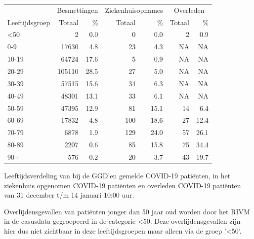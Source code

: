 \documentclass[
  english,
  man,floatsintext]{apa6}
\begin{document}
\begin{table}
\centering\begingroup\fontsize{11}{13}\selectfont

\begin{threeparttable}
\begin{tabular}{lrrrrrr}
\toprule
\multicolumn{1}{c}{ } & \multicolumn{2}{c}{Besmettingen} & \multicolumn{2}{c}{Ziekenhuisopnames} & \multicolumn{2}{c}{Overleden} \\
\cmidrule(l{3pt}r{3pt}){2-3} \cmidrule(l{3pt}r{3pt}){4-5} \cmidrule(l{3pt}r{3pt}){6-7}
Leeftijdsgroep & Totaal & \% & Totaal & \% & Totaal & \%\\
\midrule
<50 & 2 & 0.0 & 0 & 0.0 & 2 & 0.9\\
0-9 & 17630 & 4.8 & 23 & 4.3 & NA & NA\\
10-19 & 64724 & 17.6 & 5 & 0.9 & NA & NA\\
20-29 & 105110 & 28.5 & 27 & 5.0 & NA & NA\\
30-39 & 57515 & 15.6 & 34 & 6.3 & NA & NA\\
40-49 & 48301 & 13.1 & 33 & 6.1 & NA & NA\\
50-59 & 47395 & 12.9 & 81 & 15.1 & 14 & 6.4\\
60-69 & 17832 & 4.8 & 100 & 18.6 & 27 & 12.4\\
70-79 & 6878 & 1.9 & 129 & 24.0 & 57 & 26.1\\
80-89 & 2207 & 0.6 & 85 & 15.8 & 75 & 34.4\\
90+ & 576 & 0.2 & 20 & 3.7 & 43 & 19.7\\
\bottomrule
\end{tabular}
\begin{tablenotes}
\item[1] Leeftijdsverdeling van bij de GGD’en gemelde COVID-19 patiënten, in het ziekenhuis opgenomen COVID-19 patiënten en overleden COVID-19 patiënten van 31 december t/m 14 januari 10:00 uur.
\item[2] Overlijdensgevallen van patiënten jonger dan 50 jaar oud worden door het RIVM in de casusdata gegroepeerd in de categorie <50. Deze overlijdensgevallen zijn hier dus niet zichtbaar in deze leeftijdsgroepen maar alleen via de groep '<50'.
\end{tablenotes}
\end{threeparttable}
\endgroup{}
\end{table}

\newpage
\end{document}
